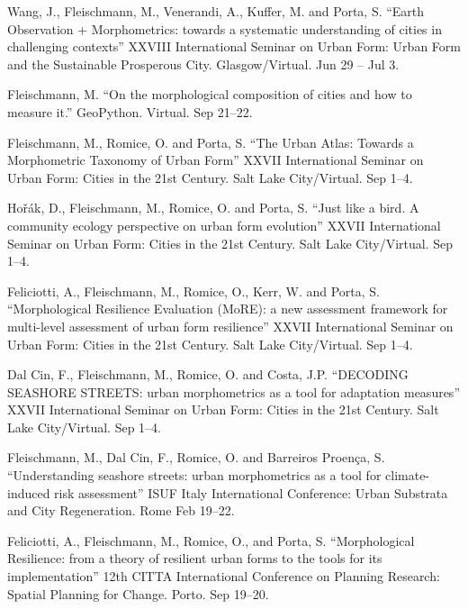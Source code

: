 \documentclass[12pt,a4paper]{report}
\begin{document}
\begin{tablist}
        \item[2021] \tab{}Wang, J., Fleischmann, M., Venerandi, A., Kuffer, M. and Porta, S. \enquote{Earth Observation + Morphometrics: towards a systematic understanding of cities in challenging contexts} XXVIII International Seminar on Urban Form: Urban Form and the Sustainable Prosperous City. Glasgow/Virtual. \@ Jun 29 -- Jul 3.

        \item[2020] \tab{}Fleischmann, M. \enquote{On the morphological composition of cities and how to measure it.} GeoPython. Virtual. \@ Sep 21--22.

        \item[2020] \tab{}Fleischmann, M., Romice, O. and Porta, S. \enquote{The Urban Atlas: Towards a Morphometric Taxonomy of Urban Form} XXVII International Seminar on Urban Form: Cities in the 21st Century. Salt Lake City/Virtual. \@ Sep 1--4.

        \item[2020] \tab{}Hořák, D., Fleischmann, M., Romice, O. and Porta, S. \enquote{Just like a bird. A community ecology perspective on urban form evolution} XXVII International Seminar on Urban Form: Cities in the 21st Century. Salt Lake City/Virtual. \@ Sep 1--4.

        \item[2020] \tab{}Feliciotti, A., Fleischmann, M., Romice, O., Kerr, W. and Porta, S. \enquote{Morphological Resilience Evaluation (MoRE): a new assessment framework for multi-level assessment of urban form resilience} XXVII International Seminar on Urban Form: Cities in the 21st Century. Salt Lake City/Virtual. \@ Sep 1--4.

        \item[2020] \tab{}Dal Cin, F., Fleischmann, M., Romice, O. and Costa, J.P. \enquote{DECODING SEASHORE STREETS: urban morphometrics as a tool for adaptation measures} XXVII International Seminar on Urban Form: Cities in the 21st Century. Salt Lake City/Virtual. \@ Sep 1--4.

        \item[2020] \tab{}Fleischmann, M., Dal Cin, F., Romice, O. and Barreiros Proença, S. \enquote{Understanding seashore streets: urban morphometrics as a tool for climate-induced risk assessment} ISUF Italy International Conference: Urban Substrata and City Regeneration. Rome \@ Feb 19--22.

        \item[2019] \tab{}Feliciotti, A., Fleischmann, M., Romice, O., and Porta, S.  \enquote{Morphological Resilience: from a theory of resilient urban forms to the tools for its implementation} 12th CITTA International Conference on Planning Research: Spatial Planning for Change. Porto. \@ Sep 19--20.


\end{tablist}
\end{document}
